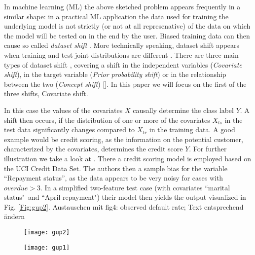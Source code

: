 In machine learning (ML) the above sketched problem appears frequently in a similar shape: in a practical ML application the data used for training the underlying model is not strictly (or not at all represenative) of the data on which the model will be tested on in the end by the user. Biased training data can then cause so called \textit{dataset shift} \citep{moreno2012unifying}. More technically speaking, dataset shift appears when training and test joint distributions are different \citep{quionero2009dataset}. There are three main types of dataset shift \citep{moreno2012unifying}, covering a shift in the independent variables (\textit{Covariate shift}), in the target variable (\textit{Prior probability shift}) or in the relationship between the two (\textit{Concept shift}) []. In this paper we will focus on the first of the three shifts, Covariate shift. 


In this case the values of the covariates $X$ causally determine the class label $Y$. A shift then occurs, if the distribution of one or more of the covariates $X_{ts}$ in the test data significantly changes compared to $X_{tr}$ in the training data. A good example would be credit scoring, as the information on the potential customer, characterized by the covariates, determines the credit score $Y$. For further illustration we take a look at \citep[Sec.~8.2]{wang2020deontological}. There a credit scoring model is employed based on the UCI Credit Data Set. The authors then  a sample bias for the variable ``Repayment status'', as the data appears to be very noisy for cases with $overdue > 3$. In a simplified two-feature test case (with covariates ``marital status"\ and ``April repayment") their model then yields the output visualized in Fig. \ref{Fig:gup2}.
{\large{Austauschen mit fig4: observed default rate; Text entsprechend ändern}}

\begin{figure}[htb!]
	\centering
	\begin{minipage}{0.45\textwidth}
		\centering
		\texttt{[image: gup2]} %
		\caption{}
		\label{Fig:gup2}
	\end{minipage}\hfill
	\begin{minipage}{0.45\textwidth}
		\centering
		\texttt{[image: gup1]} %
		\caption{}
		\label{Fig:gup1}
	\end{minipage}
\end{figure}


